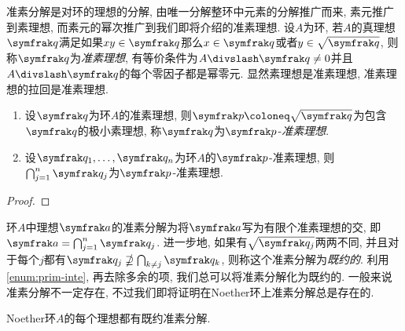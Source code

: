 准素分解是对环的理想的分解, 由唯一分解整环中元素的分解推广而来, 素元推广到素理想, 而素元的幂次推广到我们即将介绍的准素理想. 设$A$为环, 若$A$的真理想$\ideal{q}$满足如果$xy\in \ideal{q}$那么$x\in\ideal{q}$或者$y\in\sqrt{\ideal{q}}$, 则称$\ideal{q}$为\emph{准素理想}, 有等价条件为$A{\divslash}\ideal{q}\neq 0$并且$A{\divslash}\ideal{q}$的每个零因子都是幂零元. 显然素理想是准素理想, 准素理想的拉回是准素理想.

\begin{proposition}\label{prop:primary}\leavevmode
  \begin{enumerate}
    \item 设$\ideal{q}$为环$A$的准素理想, 则$\ideal{p}\coloneq \sqrt{\ideal{q}}$为包含$\ideal{q}$的极小素理想, 称$\ideal{q}$为$\ideal{p}$-\emph{准素理想}.
    \item\label{enum:prim-inte} 设$\ideal{q}_1, \dotsc, \ideal{q}_n$为环$A$的$\ideal{p}$-准素理想, 则$\bigcap_{j=1}^n\ideal{q}_j$为$\ideal{p}$-准素理想.
  \end{enumerate}
\end{proposition}

\begin{proof}
\end{proof}

环$A$中理想$\ideal{a}$的准素分解为将$\ideal{a}$写为有限个准素理想的交, 即$\ideal{a}=\bigcap_{j=1}^n\ideal{q}_j$. 进一步地, 如果有$\sqrt{\ideal{q}_j}$两两不同, 并且对于每个$j$都有$\ideal{q}_j\nsupseteq\bigcap_{k\neq j}\ideal{q}_k$, 则称这个准素分解为\emph{既约的}. 利用\ref{enum:prim-inte}, 再去除多余的项, 我们总可以将准素分解化为既约的. 一般来说准素分解不一定存在, 不过我们即将证明在Noether环上准素分解总是存在的.

\begin{theorem}\label{thm:laskernoether}
  Noether环$A$的每个理想都有既约准素分解.
\end{theorem}

